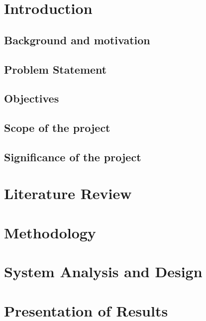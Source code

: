 \documentclass[11pt]{report}
\begin{document}
    \chapter{Introduction}\label{ch:introduction}


    \section{Background and motivation}\label{sec:background-and-motivation}
    


    \section{Problem Statement}\label{sec:problem-statement}
    


    \section{Objectives}\label{sec:objectives}
    


    \section{Scope of the project}\label{sec:scope-of-the-project}
    


    \section{Significance of the project}\label{sec:significance-of-the-project}
    


    \chapter{Literature Review}\label{ch:literature-review}
    


    \chapter{Methodology}\label{ch:methodology}
    


    \chapter{System Analysis and Design}\label{ch:system-analysis-and-design}
    


    \chapter{Presentation of Results}\label{ch:results-presentation}
    
\end{document}
